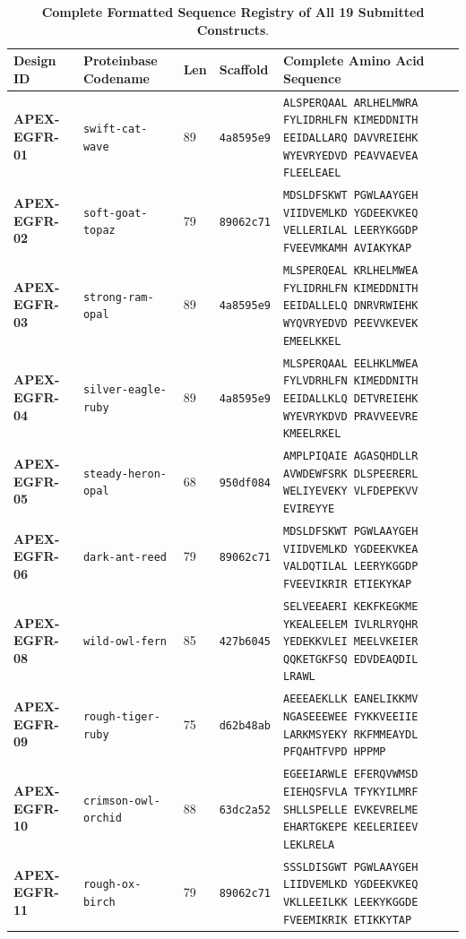\documentclass[11pt]{article}
\begin{document}
\begin{table}[htbp]
\centering
\footnotesize
\caption{\textbf{Complete Formatted Sequence Registry of All 19 Submitted Constructs}.}
\label{tab:full_sequences}
\begin{tabularx}{\textwidth}{llp{0.8cm}p{1.3cm}X}
\toprule
\textbf{Design ID} & \textbf{Proteinbase Codename} & \textbf{Len} & \textbf{Scaffold} & \textbf{Complete Amino Acid Sequence} \\
\midrule
\textbf{APEX-EGFR-01} & \texttt{swift-cat-wave} & 89 & \texttt{4a8595e9} & \texttt{ALSPERQAAL ARLHELMWRA FYLIDRHLFN KIMEDDNITH EEIDALLARQ DAVVREIEHK WYEVRYEDVD PEAVVAEVEA FLEELEAEL} \\ \midrule
\textbf{APEX-EGFR-02} & \texttt{soft-goat-topaz} & 79 & \texttt{89062c71} & \texttt{MDSLDFSKWT PGWLAAYGEH VIIDVEMLKD YGDEEKVKEQ VELLERILAL LEERYKGGDP FVEEVMKAMH AVIAKYKAP} \\ \midrule
\textbf{APEX-EGFR-03} & \texttt{strong-ram-opal} & 89 & \texttt{4a8595e9} & \texttt{MLSPERQEAL KRLHELMWEA FYLIDRHLFN KIMEDDNITH EEIDALLELQ DNRVRWIEHK WYQVRYEDVD PEEVVKEVEK EMEELKKEL} \\ \midrule
\textbf{APEX-EGFR-04} & \texttt{silver-eagle-ruby} & 89 & \texttt{4a8595e9} & \texttt{MLSPERQAAL EELHKLMWEA FYLVDRHLFN KIMEDDNITH EEIDALLKLQ DETVREIEHK WYEVRYKDVD PRAVVEEVRE KMEELRKEL} \\ \midrule
\textbf{APEX-EGFR-05} & \texttt{steady-heron-opal} & 68 & \texttt{950df084} & \texttt{AMPLPIQAIE AGASQHDLLR AVWDEWFSRK DLSPEERERL WELIYEVEKY VLFDEPEKVV EVIREYYE} \\ \midrule
\textbf{APEX-EGFR-06} & \texttt{dark-ant-reed} & 79 & \texttt{89062c71} & \texttt{MDSLDFSKWT PGWLAAYGEH VIIDVEMLKD YGDEEKVKEA VALDQTILAL LEERYKGGDP FVEEVIKRIR ETIEKYKAP} \\ \midrule
\textbf{APEX-EGFR-08} & \texttt{wild-owl-fern} & 85 & \texttt{427b6045} & \texttt{SELVEEAERI KEKFKEGKME YKEALEELEM IVLRLRYQHR YEDEKKVLEI MEELVKEIER QQKETGKFSQ EDVDEAQDIL LRAWL} \\ \midrule
\textbf{APEX-EGFR-09} & \texttt{rough-tiger-ruby} & 75 & \texttt{d62b48ab} & \texttt{AEEEAEKLLK EANELIKKMV NGASEEEWEE FYKKVEEIIE LARKMSYEKY RKFMMEAYDL PFQAHTFVPD HPPMP} \\ \midrule
\textbf{APEX-EGFR-10} & \texttt{crimson-owl-orchid} & 88 & \texttt{63dc2a52} & \texttt{EGEEIARWLE EFERQVWMSD EIEHQSFVLA TFYKYILMRF SHLLSPELLE EVKEVRELME EHARTGKEPE KEELERIEEV LEKLRELA} \\ \midrule
\textbf{APEX-EGFR-11} & \texttt{rough-ox-birch} & 79 & \texttt{89062c71} & \texttt{SSSLDISGWT PGWLAAYGEH LIIDVEMLKD YGDEEKVKEQ VKLLEEILKK LEEKYKGGDE FVEEMIKRIK ETIKKYTAP} \\ \midrule

\end{tabularx}
\end{table}
\end{document}

